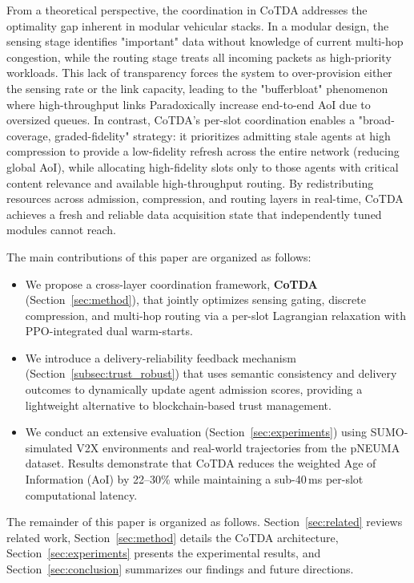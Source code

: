 \documentclass[final,3p,times,review,sort&compress]{elsarticle}
\begin{document}
From a theoretical perspective, the coordination in CoTDA addresses the optimality gap inherent in modular vehicular stacks. In a modular design, the sensing stage identifies "important" data without knowledge of current multi-hop congestion, while the routing stage treats all incoming packets as high-priority workloads. This lack of transparency forces the system to over-provision either the sensing rate or the link capacity, leading to the "bufferbloat" phenomenon where high-throughput links Paradoxically increase end-to-end AoI due to oversized queues. In contrast, CoTDA’s per-slot coordination enables a "broad-coverage, graded-fidelity" strategy: it prioritizes admitting stale agents at high compression to provide a low-fidelity refresh across the entire network (reducing global AoI), while allocating high-fidelity slots only to those agents with critical content relevance and available high-throughput routing. By redistributing resources across admission, compression, and routing layers in real-time, CoTDA achieves a fresh and reliable data acquisition state that independently tuned modules cannot reach.

The main contributions of this paper are organized as follows:
\begin{itemize}
    \item We propose a cross-layer coordination framework, \textbf{CoTDA} (Section~\ref{sec:method}), that jointly optimizes sensing gating, discrete compression, and multi-hop routing via a per-slot Lagrangian relaxation with PPO-integrated dual warm-starts.
    \item We introduce a delivery-reliability feedback mechanism (Section~\ref{subsec:trust_robust}) that uses semantic consistency and delivery outcomes to dynamically update agent admission scores, providing a lightweight alternative to blockchain-based trust management.
    \item We conduct an extensive evaluation (Section~\ref{sec:experiments}) using SUMO-simulated V2X environments and real-world trajectories from the pNEUMA dataset. Results demonstrate that CoTDA reduces the weighted Age of Information (AoI) by 22--30\% while maintaining a sub-40\,ms per-slot computational latency.
\end{itemize}
The remainder of this paper is organized as follows. Section~\ref{sec:related} reviews related work, Section~\ref{sec:method} details the CoTDA architecture, Section~\ref{sec:experiments} presents the experimental results, and Section~\ref{sec:conclusion} summarizes our findings and future directions.
\end{document}
